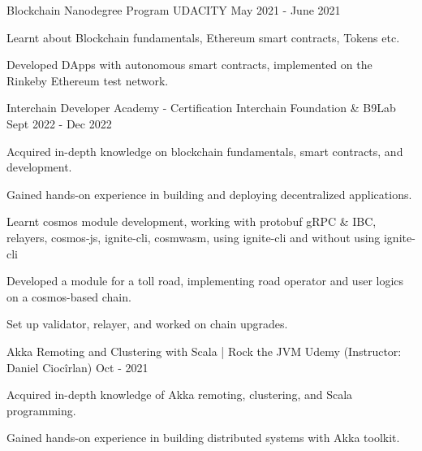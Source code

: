 \begin{cventries}

  \cventry
    {Blockchain Nanodegree Program} %
    {UDACITY} %
    {} %
    {May 2021 - June 2021} %
    {
      \begin{cvitems} %
        \item {Learnt about Blockchain fundamentals, Ethereum smart contracts, Tokens etc.}
        \item {Developed DApps with autonomous smart contracts, implemented on the Rinkeby Ethereum test network.}
      \end{cvitems}
    }

  \cventry
    {Interchain Developer Academy - Certification} %
    {Interchain Foundation \& B9Lab} %
    {} %
    {Sept 2022 - Dec 2022} %
    {
      \begin{cvitems} %
        \item {Acquired in-depth knowledge on blockchain fundamentals, smart contracts, and development.}
        \item {Gained hands-on experience in building and deploying decentralized applications.}
        \item {Learnt cosmos module development, working with protobuf gRPC \& IBC, relayers, cosmos-js, ignite-cli, cosmwasm, using ignite-cli and without using ignite-cli}
        \item {Developed a module for a toll road, implementing road operator and user logics on a cosmos-based chain.}
        \item {Set up validator, relayer, and worked on chain upgrades.}
      \end{cvitems}
    }


  \cventry
    {Akka Remoting and Clustering with Scala | Rock the JVM} %
    {Udemy (Instructor: Daniel Ciocîrlan)} %
    {} %
    {Oct - 2021} %
    {
      \begin{cvitems} %
        \item {Acquired in-depth knowledge of Akka remoting, clustering, and Scala programming.}
        \item {Gained hands-on experience in building distributed systems with Akka toolkit.}
      \end{cvitems}
    }


\end{cventries}
